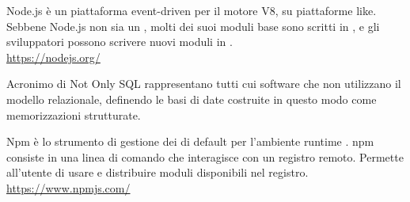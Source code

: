 Node.js è un piattaforma event-driven per il motore  V8, su piattaforme  like. Sebbene Node.js non sia un  , molti dei suoi moduli base sono scritti in , e gli sviluppatori possono scrivere nuovi moduli in .\\
\url{https://nodejs.org/}

Acronimo di Not Only SQL rappresentano tutti cui software che non utilizzano il modello relazionale, definendo le basi di date costruite in questo modo come memorizzazioni strutturate.

Npm è lo strumento di gestione dei  di default per l’ambiente runtime  . npm consiste in una linea di comando che interagisce con un registro remoto. Permette all’utente di usare e distribuire moduli  disponibili nel registro.\\
\url{https://www.npmjs.com/}
\clearpage